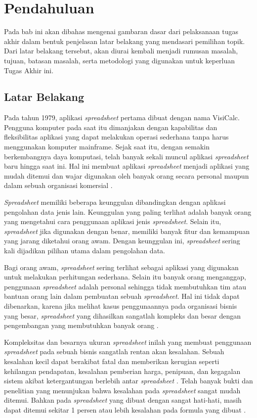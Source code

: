 \chapter{Pendahuluan}

Pada bab ini akan dibahas mengenai gambaran dasar dari pelaksanaan tugas akhir dalam bentuk penjelasan latar belakang yang mendasari pemilihan topik. Dari latar belakang tersebut, akan diurai kembali menjadi rumusan masalah, tujuan, batasan masalah, serta metodologi yang digunakan untuk keperluan Tugas Akhir ini.

\section{Latar Belakang}

Pada tahun 1979, aplikasi \textit{spreadsheet} pertama dibuat dengan nama VisiCalc. Pengguna komputer pada saat itu dimanjakan dengan kapabilitas dan fleksibilitas aplikasi yang dapat melakukan operasi sederhana tanpa harus menggunakan komputer mainframe. Sejak saat itu, dengan semakin berkembangnya daya komputasi, telah banyak sekali muncul aplikasi \textit{spreadsheet} baru hingga saat ini. Hal ini membuat aplikasi \textit{spreadsheet} menjadi aplikasi yang mudah ditemui dan wajar digunakan oleh banyak orang secara personal maupun dalam sebuah organisasi komersial \parencite{Chan1996}.

\textit{Spreadsheet} memiliki beberapa keunggulan dibandingkan dengan aplikasi pengolahan data jenis lain. Keunggulan yang paling terlihat adalah banyak orang yang mengetahui cara penggunaan aplikasi jenis \textit{spreadsheet}. Selain itu, \textit{spreadsheet} jika digunakan dengan benar, memiliki banyak fitur dan kemampuan yang jarang diketahui orang awam. Dengan keunggulan ini, \textit{spreadsheet} sering kali dijadikan pilihan utama dalam pengolahan data.

Bagi orang awam, \textit{spreadsheet} sering terlihat sebagai aplikasi yang digunakan untuk melakukan perhitungan sederhana. Selain itu banyak orang menganggap, penggunaan \textit{spreadsheet} adalah personal sehingga tidak membutuhkan tim atau bantuan orang lain dalam pembuatan sebuah \textit{spreadsheet}. Hal ini tidak dapat dibenarkan, karena jika melihat kasus penggunaannya pada organisasi bisnis yang besar, \textit{spreadsheet} yang dihasilkan sangatlah kompleks dan besar dengan pengembangan yang membutuhkan banyak orang \parencite{Panko1998}.

Kompleksitas dan besarnya ukuran \textit{spreadsheet} inilah yang membuat penggunaan \textit{spreadsheet} pada sebuah bisnis sangatlah rentan akan kesalahan. Sebuah kesalahan kecil dapat berakibat fatal dan memberikan kerugian seperti kehilangan pendapatan, kesalahan pemberian harga, penipuan, dan kegagalan sistem akibat ketergantungan berlebih antar \textit{spreadsheet} \parencite{EUSPRIGAbout}. Telah banyak bukti dan penelitian yang menunjukan bahwa kesalahan pada \textit{spreadsheet} sangat mudah ditemui. Bahkan pada \textit{spreadsheet} yang dibuat dengan sangat hati-hati, masih dapat ditemui sekitar 1 persen atau lebih kesalahan pada formula yang dibuat \parencite{Panko1998}.

